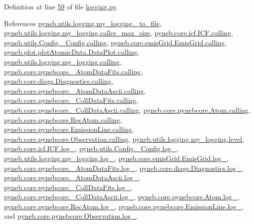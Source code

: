 Definition at line \hyperlink{logging_8py_source_l00059}{59} of file \hyperlink{logging_8py_source}{logging.\+py}.



References \hyperlink{logging_8py_source_l00179}{pyneb.\+utils.\+logging.\+my\+\_\+logging.\+\_\+to\+\_\+file}, \hyperlink{logging_8py_source_l00040}{pyneb.\+utils.\+logging.\+my\+\_\+logging.\+caller\+\_\+max\+\_\+size}, \hyperlink{icf_8py_source_l00016}{pyneb.\+core.\+icf.\+I\+C\+F.\+calling}, \hyperlink{_config_8py_source_l00032}{pyneb.\+utils.\+Config.\+\_\+\+Config.\+calling}, \hyperlink{emis_grid_8py_source_l00041}{pyneb.\+core.\+emis\+Grid.\+Emis\+Grid.\+calling}, \hyperlink{plot_atomic_data_8py_source_l00042}{pyneb.\+plot.\+plot\+Atomic\+Data.\+Data\+Plot.\+calling}, \hyperlink{logging_8py_source_l00044}{pyneb.\+utils.\+logging.\+my\+\_\+logging.\+calling}, \hyperlink{pynebcore_8py_source_l00090}{pyneb.\+core.\+pynebcore.\+\_\+\+Atom\+Data\+Fits.\+calling}, \hyperlink{diags_8py_source_l00169}{pyneb.\+core.\+diags.\+Diagnostics.\+calling}, \hyperlink{pynebcore_8py_source_l00311}{pyneb.\+core.\+pynebcore.\+\_\+\+Atom\+Data\+Ascii.\+calling}, \hyperlink{pynebcore_8py_source_l00568}{pyneb.\+core.\+pynebcore.\+\_\+\+Coll\+Data\+Fits.\+calling}, \hyperlink{pynebcore_8py_source_l00918}{pyneb.\+core.\+pynebcore.\+\_\+\+Coll\+Data\+Ascii.\+calling}, \hyperlink{pynebcore_8py_source_l01175}{pyneb.\+core.\+pynebcore.\+Atom.\+calling}, \hyperlink{pynebcore_8py_source_l02572}{pyneb.\+core.\+pynebcore.\+Rec\+Atom.\+calling}, \hyperlink{pynebcore_8py_source_l03263}{pyneb.\+core.\+pynebcore.\+Emission\+Line.\+calling}, \hyperlink{pynebcore_8py_source_l03419}{pyneb.\+core.\+pynebcore.\+Observation.\+calling}, \hyperlink{logging_8py_source_l00041}{pyneb.\+utils.\+logging.\+my\+\_\+logging.\+level}, \hyperlink{icf_8py_source_l00015}{pyneb.\+core.\+icf.\+I\+C\+F.\+log\+\_\+}, \hyperlink{_config_8py_source_l00031}{pyneb.\+utils.\+Config.\+\_\+\+Config.\+log\+\_\+}, \hyperlink{logging_8py_source_l00033}{pyneb.\+utils.\+logging.\+my\+\_\+logging.\+log\+\_\+}, \hyperlink{emis_grid_8py_source_l00040}{pyneb.\+core.\+emis\+Grid.\+Emis\+Grid.\+log\+\_\+}, \hyperlink{pynebcore_8py_source_l00080}{pyneb.\+core.\+pynebcore.\+\_\+\+Atom\+Data\+Fits.\+log\+\_\+}, \hyperlink{diags_8py_source_l00168}{pyneb.\+core.\+diags.\+Diagnostics.\+log\+\_\+}, \hyperlink{pynebcore_8py_source_l00301}{pyneb.\+core.\+pynebcore.\+\_\+\+Atom\+Data\+Ascii.\+log\+\_\+}, \hyperlink{pynebcore_8py_source_l00557}{pyneb.\+core.\+pynebcore.\+\_\+\+Coll\+Data\+Fits.\+log\+\_\+}, \hyperlink{pynebcore_8py_source_l00906}{pyneb.\+core.\+pynebcore.\+\_\+\+Coll\+Data\+Ascii.\+log\+\_\+}, \hyperlink{pynebcore_8py_source_l01162}{pyneb.\+core.\+pynebcore.\+Atom.\+log\+\_\+}, \hyperlink{pynebcore_8py_source_l02562}{pyneb.\+core.\+pynebcore.\+Rec\+Atom.\+log\+\_\+}, \hyperlink{pynebcore_8py_source_l03262}{pyneb.\+core.\+pynebcore.\+Emission\+Line.\+log\+\_\+}, and \hyperlink{pynebcore_8py_source_l03418}{pyneb.\+core.\+pynebcore.\+Observation.\+log\+\_\+}.



